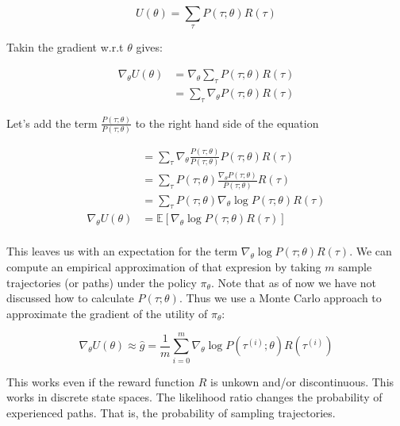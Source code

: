 \documentclass{../main.tex}{subfiles}
\begin{document}
\begin{equation}
U(\theta) = \sum_{\tau}P(\tau ; \theta) R(\tau)
\end{equation}

Takin the gradient w.r.t $\theta$ gives:

\begin{equation}
\begin{split}
\nabla_{\theta} U(\theta) & = \nabla_{\theta} \sum_{\tau}P(\tau ; \theta) R(\tau) \\
& =  \sum_{\tau} \nabla_{\theta} P(\tau ; \theta) R(\tau)
\end{split}
\end{equation}

Let's add the term $\frac{P(\tau; \theta)}{P(\tau ; \theta)}$ to the right hand side of the equation

\begin{equation}\label{equation:approximate-gradient}
\begin{split}
& =  \sum_{\tau} \nabla_{\theta} \frac{P(\tau; \theta)}{P(\tau ; \theta)} P(\tau ; \theta) R(\tau) \\
& =  \sum_{\tau} P(\tau; \theta) \frac{\nabla_{\theta} P(\tau ; \theta)}{P(\tau ; \theta)} R(\tau) \\
& =  \sum_{\tau} P(\tau; \theta) \nabla_{\theta} \log P(\tau ; \theta) R(\tau) \\
\nabla_{\theta} U(\theta) & = \mathbb{E} [\nabla_{\theta} \log P(\tau ; \theta) R(\tau)] \\
\end{split}
\end{equation}

This leaves us with an expectation for the term $\nabla_{\theta} \log P(\tau ; \theta) R(\tau)$. We can compute an empirical approximation of that expresion by taking $m$ sample trajectories (or paths) under the policy $\pi_{\theta}$. Note that as of now we have not discussed how to calculate $P(\tau ; \theta)$. Thus we use a Monte Carlo approach to approximate the gradient of the utility of $\pi_{\theta}$:

\begin{equation}\label{equation:approximate-gradient-vanilla}
\nabla_{\theta}U(\theta) \approx \hat{g} = \frac{1}{m} \sum_{i = 0}^{m} \nabla_{\theta} \log P(\tau^{(i)} ; \theta) R(\tau^{(i)})
\end{equation}

This works even if the reward function $R$ is unkown and/or discontinuous. This works in discrete state spaces. The likelihood ratio changes the probability of experienced paths. That is, the probability of sampling trajectories.
\end{document}
